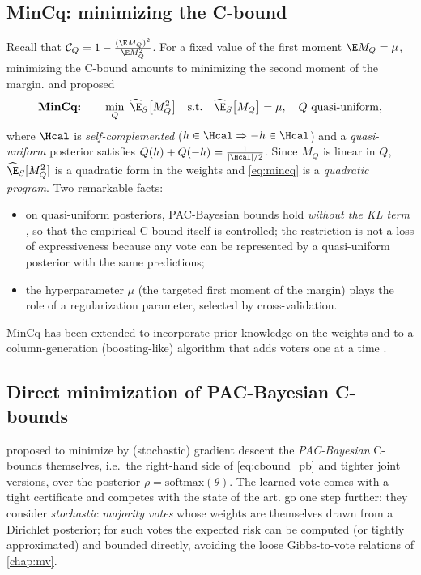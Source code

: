 \subsection{MinCq: minimizing the C-bound}

Recall that $\mathcal C_Q=1-\frac{(\E M_Q)^2}{\E M_Q^2}$. For a fixed value of the
first moment $\E M_Q=\mu$, minimizing the C-bound amounts to minimizing the
second moment of the margin. \citet{laviolette2011from} and
\citet{germain2015risk} proposed
\begin{equation}\label{eq:mincq}
\textbf{MinCq:}\qquad \min_{Q}\ \widehat{\E}_S\big[M_Q^2\big]\quad\text{s.t.}\quad\widehat{\E}_S\big[M_Q\big]=\mu,\quad Q\text{ quasi-uniform},
\end{equation}
where $\Hcal$ is \emph{self-complemented} ($h\in\Hcal\Rightarrow-h\in\Hcal$) and a
\emph{quasi-uniform} posterior satisfies $Q(h)+Q(-h)=\frac1{|\Hcal|/2}$. Since
$M_Q$ is linear in $Q$, $\widehat\E_S[M_Q^2]$ is a quadratic form in the weights
and \eqref{eq:mincq} is a \emph{quadratic program}. Two remarkable facts:
\begin{itemize}
\item on quasi-uniform posteriors, PAC-Bayesian bounds hold \emph{without the KL
      term} \citep{germain2015risk}, so that the empirical C-bound itself is controlled;
      the restriction is not a loss of expressiveness because any vote can be
      represented by a quasi-uniform posterior with the same predictions;
\item the hyperparameter $\mu$ (the targeted first moment of the margin)
      plays the role of a regularization parameter, selected by cross-validation.
\end{itemize}
MinCq has been extended to incorporate prior knowledge on the weights
\citep[P-MinCq,][]{bellet2014learning} and to a column-generation (boosting-like)
algorithm that adds voters one at a time \citep[CqBoost,][]{roy2016column}.

\subsection{Direct minimization of PAC-Bayesian C-bounds}

\citet{viallard2021self} proposed to minimize by (stochastic) gradient descent
the \emph{PAC-Bayesian} C-bounds themselves, i.e.\ the right-hand side of
\eqref{eq:cbound_pb} and tighter joint versions, over the posterior
$\rho=\mathrm{softmax}(\theta)$. The learned vote comes with a tight certificate
and competes with the state of the art. \citet{zantedeschi2021learning} go one
step further: they consider \emph{stochastic majority votes} whose weights are
themselves drawn from a Dirichlet posterior; for such votes the expected risk
can be computed (or tightly approximated) and bounded directly, avoiding the
loose Gibbs-to-vote relations of \cref{chap:mv}.

